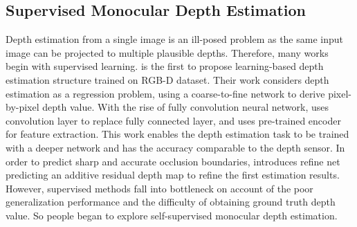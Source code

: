 \documentclass[letterpaper]{article} \usepackage{aaai21}  \usepackage{times}  \usepackage{helvet} \usepackage{courier}  \usepackage[hyphens]{url}  \usepackage{graphicx} \urlstyle{rm} \def\UrlFont{\rm}  \usepackage{natbib}  \usepackage{caption} \frenchspacing  \setlength{\pdfpagewidth}{8.5in}  \setlength{\pdfpageheight}{11in}  \usepackage{booktabs}
\begin{document}
\subsection{Supervised Monocular Depth Estimation}
Depth estimation from a single image is an ill-posed problem as the same input image can be projected to multiple plausible depths. Therefore, many works begin with supervised learning. 
\cite{eigen2015predicting} is the first to propose learning-based depth estimation structure trained on RGB-D dataset. Their work considers depth estimation as a regression problem, using a coarse-to-fine network to derive pixel-by-pixel depth value.
With the rise of fully convolution neural network, \cite{laina2016deeper} uses convolution layer to replace fully connected layer, and uses pre-trained encoder for feature extraction. This work enables the depth estimation task to be trained with a deeper network
and has the accuracy comparable to the depth sensor. In order to predict sharp and accurate occlusion boundaries, \cite{ramamonjisoa2020predicting} introduces refine net predicting an additive residual depth map to refine the first estimation results. 
However, supervised methods fall into bottleneck on account of the poor generalization performance and the difficulty of obtaining ground truth depth value. So people began to explore self-supervised monocular depth estimation. 
\end{document}
